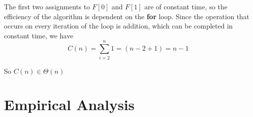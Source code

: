 \documentclass[letterpaper, 11pt]{article}
\begin{document}
The first two assignments to \(F[0]\) and \(F[1]\) are of constant time, so the
efficiency of the algorithm is dependent on the \textbf{for} loop. Since the 
operation that occurs on every iteration of the loop is addition, which can be
completed in constant time, we have
\[C(n) = \sum_{i = 2}^{n} 1 = (n - 2 + 1) = n - 1\]

So \(C(n) \in \Theta(n)\)

\section*{Empirical Analysis}
\end{document}
